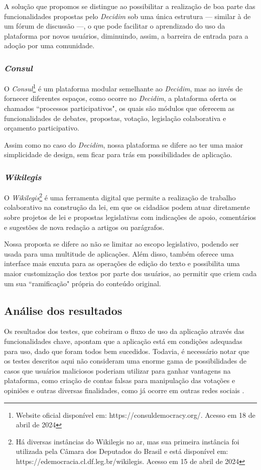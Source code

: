 A solução que propomos se distingue ao possibilitar a realização de boa parte das funcionalidades propostas pelo \textit{Decidim} sob uma única estrutura — similar à de um fórum de discussão —, o que pode facilitar o aprendizado do uso da plataforma por novos usuários, diminuindo, assim, a barreira de entrada para a adoção por uma comunidade.

\subsubsection{\textit{Consul}}
O \textit{Consul}\footnote{Website oficial disponível em: https://consuldemocracy.org/. Acesso em 18 de abril de 2024} é um plataforma modular semelhante ao \textit{Decidim}, mas ao invés de fornecer diferentes espaços, como ocorre no \textit{Decidim}, a plataforma oferta os chamados “processos participativos", os quais são módulos que oferecem as funcionalidades de debates, propostas, votação, legislação colaborativa e orçamento participativo.

Assim como no caso do \textit{Decidim}, nossa plataforma se difere ao ter uma maior simplicidade de design, sem ficar para trás em possibilidades de aplicação.

\subsubsection{\textit{Wikilegis}}
O \textit{Wikilegis}\footnote{Há diversas instâncias do Wikilegis no ar, mas sua primeira instância foi utilizada pela Câmara dos Deputados do Brasil e está disponível em: https://edemocracia.cl.df.leg.br/wikilegis. Acesso em 15 de abril de 2024} é uma ferramenta digital que permite a realização de trabalho colaborativo na construção da lei, em que os cidadãos podem atuar diretamente sobre projetos de lei e propostas legislativas com indicações de apoio, comentários e sugestões de nova redação a artigos ou parágrafos.

Nossa proposta se difere ao não se limitar ao escopo legislativo, podendo ser usada para uma multitude de aplicações. Além disso, também oferece uma interface mais enxuta para as operações de edição do texto e possibilita uma maior customização dos textos por parte dos usuários, ao permitir que criem cada um sua “ramificação" própria do conteúdo original. 

\subsection{Análise dos resultados}
Os resultados dos testes, que cobriram o fluxo de uso da aplicação através das funcionalidades chave, apontam que a aplicação está em condições adequadas para uso, dado que foram todos bem sucedidos. Todavia, é necessário notar que os testes descritos aqui não consideram uma enorme gama de possibilidades de casos que usuários maliciosos poderiam utilizar para ganhar vantagens na plataforma, como criação de contas falsas para manipulação das votações e opiniões e outras diversas finalidades, como já ocorre em outras redes sociais \cite{socialMediaBots}.

